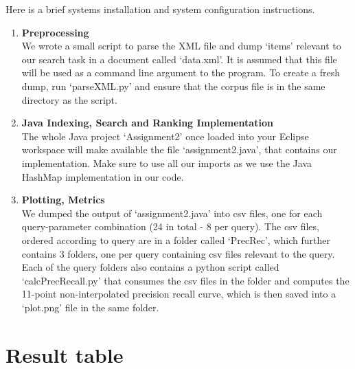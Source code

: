Here is a brief systems installation and system configuration instructions. 

\begin{enumerate}

\item {\bf Preprocessing} \\
We wrote a small script to parse the XML file and dump \lq items' relevant to our search task
in a document called \lq data.xml'. It is assumed that this file will be used as a command line
argument to the program. To create a fresh dump, run \lq parseXML.py' and ensure that the corpus
file is in the same directory as the script. 
\item {\bf Java Indexing, Search and Ranking Implementation} \\
The whole Java project \lq Assignment2' once loaded into your Eclipse workspace
will make available the file \lq assignment2.java', that contains our implementation. 
Make sure to use all our imports as we use the Java HashMap implementation in our code.
\item {\bf Plotting, Metrics} \\
We dumped the output of \lq assignment2.java' into csv files, one for each query-parameter
combination (24 in total - 8 per query). The csv files, ordered according to query are in
a folder called \lq PrecRec', which further contains 3 folders, one per query containing csv
files relevant to the query. Each of the query folders also contains a python script called \lq calcPrecRecall.py\rq 
that consumes the csv files in the folder and computes the 11-point non-interpolated precision recall curve,
which is then saved into a \lq plot.png' file in the same folder. 
\end{enumerate}


\newpage
\section{Result table} \label{App:table}

